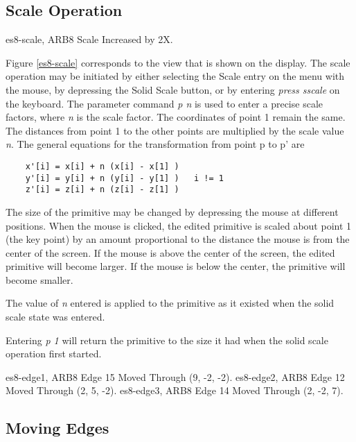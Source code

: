 \subsection{Scale Operation}
\mfig es8-scale, ARB8 Scale Increased by 2X.


Figure \ref{es8-scale} corresponds to the view that is shown on the display.
The scale operation may be initiated by either selecting
the Scale entry  on the menu with the mouse,
by depressing the Solid Scale button,
or by entering {\em press sscale} on the keyboard.
The parameter command {\em p n} is
used to enter a precise scale factors, where {\em n} is
the scale factor.
The coordinates of point 1 remain the same.  The distances
from point 1 to the other points are multiplied by the scale value {\em n}.
The general equations for the transformation from point p to p' are

\begin{verbatim}
    x'[i] = x[i] + n (x[i] - x[1] )
    y'[i] = y[i] + n (y[i] - y[1] )   i != 1
    z'[i] = z[i] + n (z[i] - z[1] )
\end{verbatim}

The size of the primitive may be changed by depressing the mouse at
different positions.  When the mouse is clicked, the
edited primitive is scaled about point 1 (the key point)
by an amount proportional
to the distance the mouse is from the center of the screen.  If the mouse
is above the center of the screen, the edited primitive will become larger.
If the
mouse is below the center, the primitive will become smaller.

The value of {\em n} entered is applied to the primitive as it existed when the
solid scale state was entered.

Entering {\em p 1} will return the primitive
to the size it had when the solid scale operation first started.


\mfig es8-edge1, ARB8 Edge 15 Moved Through (9, -2, -2).
\mfig es8-edge2, ARB8 Edge 12 Moved Through (2, 5, -2).
\mfig es8-edge3, ARB8 Edge 14 Moved Through (2, -2, 7).
\subsection{Moving Edges}

